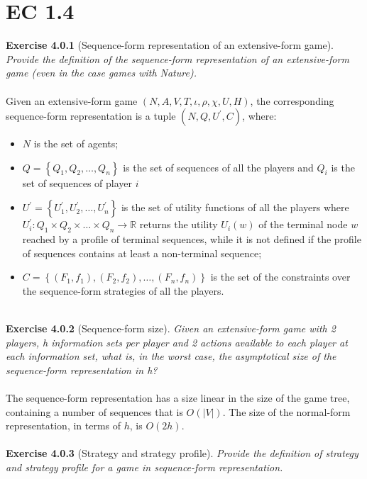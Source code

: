 \section{EC 1.4}
\textbf{Exercise 4.0.1} (Sequence-form representation of an extensive-form game). \textit{Provide the definition of the sequence-form representation of an extensive-form game (even in the case games with Nature).}\\\\
Given an extensive-form game $(N, A, V, T, \iota, \rho, \chi, U, H)$,  the corresponding sequence-form representation is a tuple $ (N, Q, U^{\prime}, C) $,  where:
\begin{itemize}
\item $N$ is the set of agents;
\item $ Q=\left\{Q_{1}, Q_{2}, \ldots, Q_{n}\right\}$ is the set of sequences of all the players and $Q_{i}$ is the set of sequences of player $i$
\item $U^{\prime}=\left\{U_{1}^{\prime}, U_{2}^{\prime}, \ldots, U_{n}^{\prime}\right\}$ is the set of utility functions of all the players where $U_{i}^{\prime}: Q_{1} \times Q_{2} \times \ldots \times Q_{n} \rightarrow \mathbb{R}$ returns the utility $U_{i}(w)$ of the terminal node $w$ reached by a profile of terminal sequences, while it is not defined if the profile of sequences contains at least a non-terminal sequence;
\item $ C=\left\{\left(F_{1}, f_{1}\right),\left(F_{2}, f_{2}\right), \ldots,\left(F_{n}, f_{n}\right)\right\}$ is the set of the constraints over the sequence-form strategies of all the players.\\\\
\end{itemize}
\textbf{Exercise 4.0.2} (Sequence-form size). \textit{Given an extensive-form game with 2 players, h information sets per player and 2 actions available to each player at each information set, what is, in the worst case, the asymptotical size of the sequence-form representation in h?}\\\\
The sequence-form representation has a size linear in the size of the game tree, containing a number of sequences that is $O(|V|)$. The size of the normal-form representation, in terms of $h$, is $O(2h)$.\\\\
\textbf{Exercise 4.0.3} (Strategy and strategy profile). \textit{Provide the definition of strategy and strategy profile for a game in sequence-form representation.}\\\\
